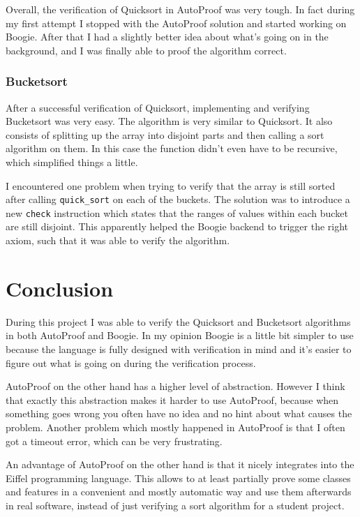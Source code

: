 \documentclass[a4paper,10pt]{article}
\begin{document}
Overall, the verification of Quicksort in AutoProof was very tough.
In fact during my first attempt I stopped with the AutoProof solution and started working on Boogie.
After that I had a slightly better idea about what's going on in the background, and I was finally able to proof the algorithm correct.

\subsubsection{Bucketsort}

After a successful verification of Quicksort, implementing and verifying Bucketsort was very easy.
The algorithm is very similar to Quicksort.
It also consists of splitting up the array into disjoint parts and then calling a sort algorithm on them.
In this case the function didn't even have to be recursive, which simplified things a little.

I encountered one problem when trying to verify that the array is still sorted after calling \lstinline!quick_sort! on each of the buckets.
The solution was to introduce a new \lstinline!check! instruction which states that the ranges of values within each bucket are still disjoint.
This apparently helped the Boogie backend to trigger the right axiom, such that it was able to verify the algorithm.

\section {Conclusion}

During this project I was able to verify the Quicksort and Bucketsort algorithms in both AutoProof and Boogie.
In my opinion Boogie is a little bit simpler to use because the language is fully designed with verification in mind
and it's easier to figure out what is going on during the verification process.

AutoProof on the other hand has a higher level of abstraction.
However I think that exactly this abstraction makes it harder to use AutoProof, 
because when something goes wrong you often have no idea and no hint about what causes the problem.
Another problem which mostly happened in AutoProof is that I often got a timeout error, which can be very frustrating.

An advantage of AutoProof on the other hand is that it nicely integrates into the Eiffel programming language.
This allows to at least partially prove some classes and features in a convenient and mostly automatic way
and use them afterwards in real software, instead of just verifying a sort algorithm for a student project.
\end{document}
